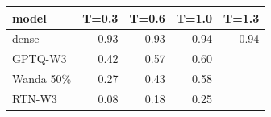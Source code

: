 \begin{tabular}{lrrrr}
\toprule
model & T=0.3 & T=0.6 & T=1.0 & T=1.3 \\
\midrule
dense & 0.93 & 0.93 & 0.94 & 0.94 \\
GPTQ-W3 & 0.42 & 0.57 & 0.60 &  \\
Wanda 50\% & 0.27 & 0.43 & 0.58 &  \\
RTN-W3 & 0.08 & 0.18 & 0.25 &  \\
\bottomrule
\end{tabular}
